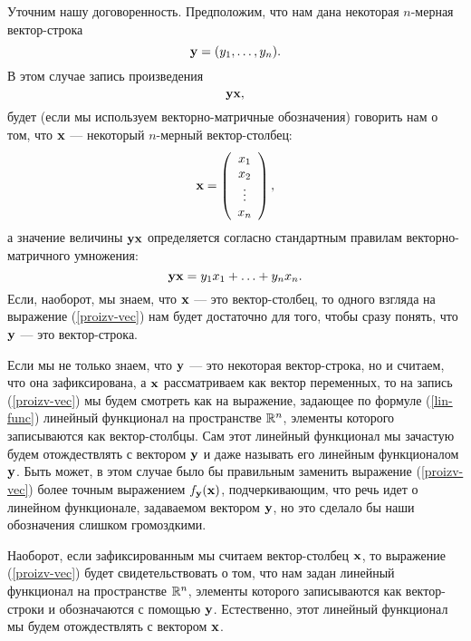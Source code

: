     Уточним нашу договоренность. Предположим, что нам дана
    некоторая $n$-мерная вектор-строка
    \[\mathbf{y}=(y_{1},\ldots,y_{n}).\]
    В этом случае запись произведения
\begin{equation} \label{proizv-vec}
    \mathbf{y}\mathbf{x},
\end{equation}
    будет (если мы используем векторно-матричные обозначения) говорить нам о том, что
     $\mathbf{x}$ --- некоторый $n$-мерный вектор-столбец:
        \[\mathbf{x}=\left(
     \begin{array}{c}
        x_{1} \\
        x_{2} \\
        \vdots \\
        x_{n}  \\
      \end{array}
    \right),\]
    а значение величины $\mathbf{y}\mathbf{x}$ определяется согласно
    стандартным правилам векторно-матричного умножения:
    \begin{equation} \label{lin-func}
    \mathbf{y}\mathbf{x}=y_{1}x_{1}+\ldots+y_{n}x_{n}.
    \end{equation}
    Если, наоборот, мы знаем, что $\mathbf{x}$ --- это вектор-столбец,
    то одного взгляда на выражение (\ref{proizv-vec}) нам будет
    достаточно для того, чтобы сразу понять, что $\mathbf{y}$ --- это
    вектор-строка.

    Если мы не только знаем, что $\mathbf{y}$ --- это
    некоторая вектор-строка,    но и считаем, что она зафиксирована,
    а $\mathbf{x}$ рассматриваем как вектор переменных, то
    на запись (\ref{proizv-vec}) мы будем смотреть как на выражение,
    задающее по формуле (\ref{lin-func}) линейный функционал
     на пространстве $\mathbb{R}^{n}$, элементы которого записываются как
     вектор-столбцы. Сам этот линейный
     функционал мы зачастую будем отождествлять с вектором $\mathbf{y}$ и
     даже называть его линейным функционалом $\mathbf{y}$. Быть может, в
     этом случае было бы правильным заменить выражение (\ref{proizv-vec}) более
     точным выражением $f_{\mathbf{y}}(\mathbf{x})$, подчеркивающим, что
     речь идет о линейном функционале, задаваемом вектором
     $\mathbf{y}$, но это сделало бы наши обозначения слишком громоздкими.

     Наоборот, если зафиксированным мы считаем
     вектор-столбец $\mathbf{x}$, то выражение (\ref{proizv-vec}) будет
     свидетельствовать о том, что нам задан линейный функционал на
     пространстве $\mathbb{R}^{n}$, элементы которого записываются как
     вектор-строки и обозначаются с помощью $\mathbf{y}$. Естественно, этот
     линейный функционал мы будем отождествлять с вектором $\mathbf{x}$.

